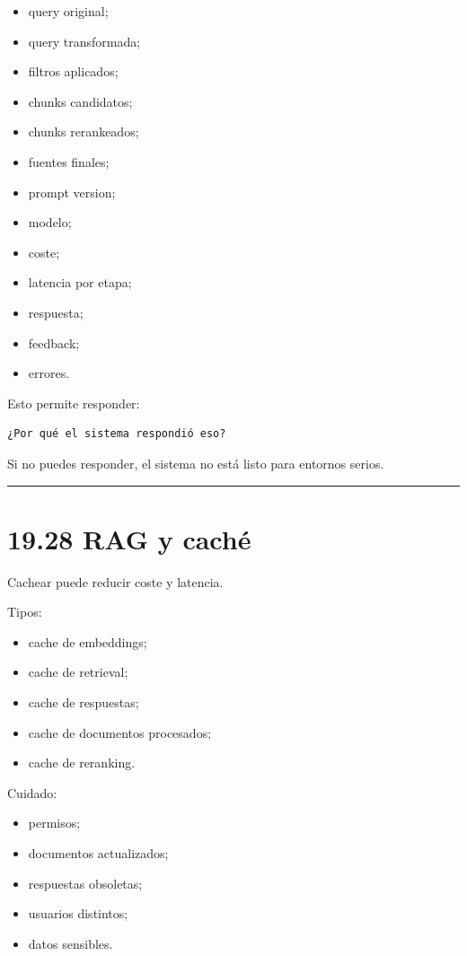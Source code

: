 \begin{itemize}
\tightlist
\item
  query original;
\item
  query transformada;
\item
  filtros aplicados;
\item
  chunks candidatos;
\item
  chunks rerankeados;
\item
  fuentes finales;
\item
  prompt version;
\item
  modelo;
\item
  coste;
\item
  latencia por etapa;
\item
  respuesta;
\item
  feedback;
\item
  errores.
\end{itemize}

Esto permite responder:

\begin{lstlisting}
¿Por qué el sistema respondió eso?
\end{lstlisting}

Si no puedes responder, el sistema no está listo para entornos serios.

\begin{center}\rule{0.5\linewidth}{0.5pt}\end{center}

\section{19.28 RAG y caché}\label{rag-y-cachuxe9}

Cachear puede reducir coste y latencia.

Tipos:

\begin{itemize}
\tightlist
\item
  cache de embeddings;
\item
  cache de retrieval;
\item
  cache de respuestas;
\item
  cache de documentos procesados;
\item
  cache de reranking.
\end{itemize}

Cuidado:

\begin{itemize}
\tightlist
\item
  permisos;
\item
  documentos actualizados;
\item
  respuestas obsoletas;
\item
  usuarios distintos;
\item
  datos sensibles.
\end{itemize}


